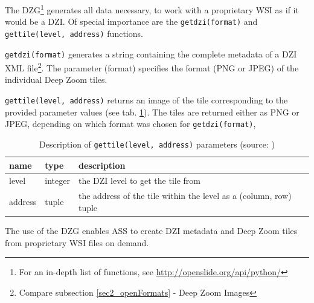 The DZG\footnote{
	For an in-depth list of functions, see \url{http://openslide.org/api/python/}
} generates all data necessary, to work with a proprietary WSI as if it would be a DZI\cite{web:openslide}. Of special importance are the \texttt{get{\textunderscore}dzi(format)} and \texttt{get{\textunderscore}tile(level, address)} functions.

\texttt{get{\textunderscore}dzi(format)} generates a string containing the complete metadata of a DZI XML file\footnote{
	Compare subsection \ref{sec2_openFormats} - Deep Zoom Images
}. The parameter (format) specifies the format (PNG or JPEG) of the individual Deep Zoom tiles.

\texttt{get{\textunderscore}tile(level, address)} returns an image of the tile corresponding to the provided parameter values (see tab. \ref{tab4_getTileParams}). The tiles are returned either as PNG or JPEG, depending on which format was chosen for \texttt{get{\textunderscore}dzi(format)}, 

\begin{table}[H]
	\begin{center}
		\begin{tabular}{| p{1.5cm} | p{1.5cm} | p{7cm} |}
			\hline
			\textbf{name} & \textbf{type} & \textbf{description}\\ \hline
			level & integer & the DZI level to get the tile from \\ \hline
			address & tuple & the address of the tile within the level as a (column, row) tuple\\ \hline
		\end{tabular}
		\caption{Description of \texttt{get{\textunderscore}tile(level, address)} parameters (source: \cite{web:openslide})}
		\label{tab4_getTileParams}
	\end{center}
\end{table}

The use of the DZG enables ASS to create DZI metadata and Deep Zoom tiles from proprietary WSI files on demand.



